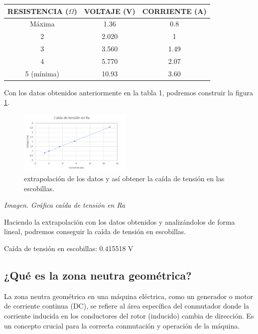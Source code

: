 \begin{tabular}{|c|c|c|}
\hline
RESISTENCIA ($\Omega$) & VOLTAJE (V) & CORRIENTE (A) \\
\hline
Máxima & 1.36 & 0.8 \\
2 & 2.020 & 1 \\
3 & 3.560 & 1.49 \\
4 & 5.770 & 2.07 \\
5 (mínima) & 10.93 & 3.60 \\
\hline
\end{tabular}

Con los datos obtenidos anteriormente en la tabla 1, podremos construir la figura \ref{fig:grafica}.
\begin{figure}[ht!]
    \centering
    \includegraphics[width=0.48\textwidth]{fot/Prac_6_graf.png}
    \caption{extrapolación de los datos y así obtener la caída de tensión en las escobillas.}
    \label{fig:grafica}
\end{figure}

\textit{Imagen. Gráfica caída de tensión en Ra}

Haciendo la extrapolación con los datos obtenidos y analizándolos de forma lineal, podremos conseguir la caída de tensión en escobillas.

Caída de tensión en escobillas: 0.415518 V

\subsection*{¿Qué es la zona neutra geométrica?}
La zona neutra geométrica en una máquina eléctrica, como un generador o motor de corriente continua (DC), se refiere al área específica del conmutador donde la corriente inducida en los conductores del rotor (inducido) cambia de dirección. Es un concepto crucial para la correcta conmutación y operación de la máquina.
